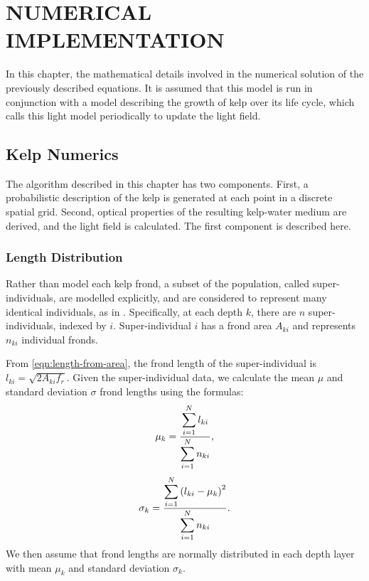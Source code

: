 \chapter{NUMERICAL IMPLEMENTATION}

In this chapter, the mathematical details involved in the numerical solution of the previously described equations.
It is assumed that this model is run in conjunction with a model describing the growth of kelp over its life cycle, which calls this light model periodically to update the light field.

\section{Kelp Numerics}

The algorithm described in this chapter has two components.
First, a probabilistic description of the kelp is generated at each point in a discrete spatial grid.
Second, optical properties of the resulting kelp-water medium are derived, and the light field is calculated.
The first component is described here.

\subsection{Length Distribution}

Rather than model each kelp frond, a subset of the population, called super-individuals, are modelled explicitly, and are considered to represent many identical individuals, as in \citep{scheffer_super-individuals_1994}.
Specifically, at each depth $k$, there are $n$ super-individuals, indexed by $i$.
Super-individual $i$ has a frond area $A_{ki}$ and represents $n_{ki}$ individual fronds.

From \eqref{eqn:length-from-area}, the frond length of the super-individual is $l_{ki} = \sqrt{2A_{ki}f_r}$.
Given the super-individual data, we calculate the mean $\mu$ and standard deviation $\sigma$ frond
lengths using the formulas:
\begin{equation}
  \mu_k = \frac{\displaystyle \sum_{i=1}^N l_{ki}}{\displaystyle \sum_{i=1}^N n_{ki}},
\end{equation}
\begin{equation}
  \sigma_k = \frac{\displaystyle \sum_{i=1}^N \left( l_{ki} - \mu_k \right)^2}{\displaystyle \sum_{i=1}^N n_{ki}}.
\end{equation}
We then assume that frond lengths are normally distributed in each depth layer
with mean $\mu_k$ and standard deviation $\sigma_k$.

